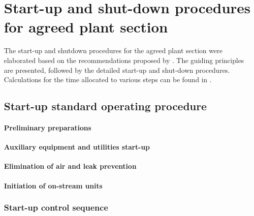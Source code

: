 \section{Start-up and shut-down procedures for agreed plant section}
The start-up and shutdown procedures for the agreed plant section were elaborated based on the recommendations proposed by \textcite{}. The guiding principles are presented, followed by the detailed start-up and shut-down procedures. Calculations for the time allocated to various steps can be found in .

\subsection{Start-up standard operating procedure}

\paragraph{Preliminary preparations}

\paragraph{Auxiliary equipment and utilities start-up}

\paragraph{Elimination of air and leak prevention}

\paragraph{Initiation of on-stream units}



\subsubsection{Start-up control sequence}


